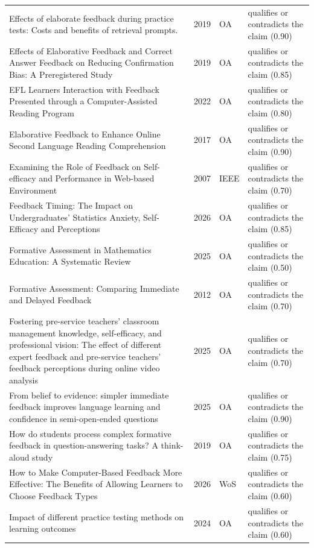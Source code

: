 \begin{longtable}{@{}%
  >{\raggedright\arraybackslash}p{}c%
  >{\raggedright\arraybackslash}p{}%
  >{\raggedright\arraybackslash}p{}@{}}
Effects of elaborate feedback during practice tests: Costs and benefits of retrieval prompts. & 2019 & OA & qualifies or contradicts the claim (0.90) \\
Effects of Elaborative Feedback and Correct Answer Feedback on Reducing Confirmation Bias: A Preregistered Study & 2019 & OA & qualifies or contradicts the claim (0.85) \\
EFL Learners Interaction with Feedback Presented through a Computer-Assisted Reading Program & 2022 & OA & qualifies or contradicts the claim (0.80) \\
Elaborative Feedback to Enhance Online Second Language Reading Comprehension & 2017 & OA & qualifies or contradicts the claim (0.90) \\
Examining the Role of Feedback on Self-efficacy and Performance in Web-based Environment & 2007 & IEEE & qualifies or contradicts the claim (0.70) \\
Feedback Timing: The Impact on Undergraduates' Statistics Anxiety, Self-Efficacy and Perceptions & 2026 & OA & qualifies or contradicts the claim (0.85) \\
Formative Assessment in Mathematics Education: A Systematic Review & 2025 & OA & qualifies or contradicts the claim (0.50) \\
Formative Assessment: Comparing Immediate and Delayed Feedback & 2012 & OA & qualifies or contradicts the claim (0.70) \\
Fostering pre-service teachers' classroom management knowledge, self-efficacy, and professional vision: The effect of different expert feedback and pre-service teachers' feedback perceptions during online video analysis & 2025 & OA & qualifies or contradicts the claim (0.70) \\
From belief to evidence: simpler immediate feedback improves language learning and confidence in semi-open-ended questions & 2025 & OA & qualifies or contradicts the claim (0.90) \\
How do students process complex formative feedback in question-answering tasks? A think-aloud study & 2019 & OA & qualifies or contradicts the claim (0.75) \\
How to Make Computer-Based Feedback More Effective: The Benefits of Allowing Learners to Choose Feedback Types & 2026 & WoS & qualifies or contradicts the claim (0.60) \\
Impact of different practice testing methods on learning outcomes & 2024 & OA & qualifies or contradicts the claim (0.60) \\

\end{longtable}
